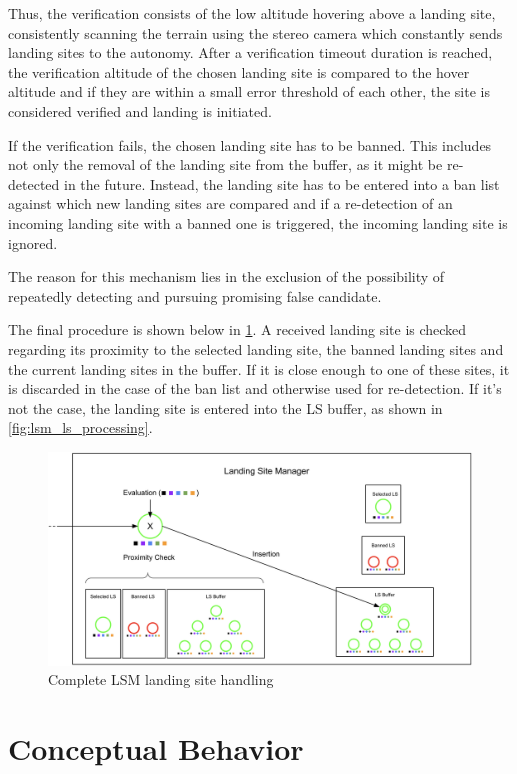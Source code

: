 Thus, the verification consists of the low altitude hovering above a landing site, consistently scanning the terrain using the stereo camera which constantly sends landing sites to the autonomy. After a verification timeout duration is reached, the verification altitude of the chosen landing site is compared to the hover altitude and if they are within a small error threshold of each other, the site is considered verified and landing is initiated.

If the verification fails, the chosen landing site has to be banned. This includes not only the removal of the landing site from the buffer, as it might be re-detected in the future. Instead, the landing site has to be entered into a ban list against which new landing sites are compared and if a re-detection of an incoming landing site with a banned one is triggered, the incoming landing site is ignored. 

The reason for this mechanism lies in the exclusion of the possibility of repeatedly detecting and pursuing promising false candidate.

The final procedure is shown below in \cref{fig:lsm_complete}. A received landing site is checked regarding its proximity to the selected landing site, the banned landing sites and the current landing sites in the buffer. If it is close enough to one of these sites, it is discarded in the case of the ban list and otherwise used for re-detection. If it's not the case, the landing site is entered into the LS buffer, as shown in \cref{fig:lsm_ls_processing}.

\begin{figure}[h]
\centering
\includegraphics[scale=0.16]{images/autonomous_landing/lsm_complete.png}
\caption{Complete LSM landing site handling}
\label{fig:lsm_complete}
\end{figure}

\section{Conceptual Behavior}\label{sec:concept_beh}

